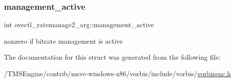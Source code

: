 \subsubsection{\texorpdfstring{management\+\_\+active}{management\_active}}
{\footnotesize\ttfamily int ovectl\+\_\+ratemanage2\+\_\+arg\+::management\+\_\+active}

nonzero if bitrate management is active 

The documentation for this struct was generated from the following file\+:\begin{DoxyCompactItemize}
\item 
/\+T\+M\+S\+Engine/contrib/msvc-\/windows-\/x86/vorbis/include/vorbis/\hyperlink{vorbisenc_8h}{vorbisenc.\+h}\end{DoxyCompactItemize}
